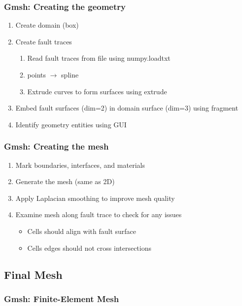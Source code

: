 \documentclass[aspectratio=169]{beamer}
\begin{document}
\begin{frame}
  \frametitle{Gmsh: Creating the geometry}
  \summary{}
  
  \begin{enumerate}
  \item Create domain (box)\pause
  \item Create fault traces
    \begin{enumerate}
    \item Read fault traces from file using {\ttfamily numpy.loadtxt}
    \item points $\rightarrow$ spline
    \item Extrude curves to form surfaces using {\ttfamily extrude}
    \end{enumerate}\pause
  \item Embed fault surfaces (dim=2) in domain surface (dim=3) using {\ttfamily fragment}\pause
  \item Identify geometry entities using GUI
  \end{enumerate}
  
\end{frame}


\begin{frame}
  \frametitle{Gmsh: Creating the mesh}
  
  \begin{enumerate}
  \item Mark boundaries, interfaces, and materials
  \item Generate the mesh (same as 2D)
  \item Apply Laplacian smoothing to improve mesh quality
  \item Examine mesh along fault trace to check for any issues
    \begin{itemize}
    \item Cells should align with fault surface
    \item Cells edges should not cross intersections
    \end{itemize}
  \end{enumerate}
  
\end{frame}


\subsection{Final Mesh}

\begin{frame}
  \frametitle{Gmsh: Finite-Element Mesh}

  
\end{frame}




\end{document}
